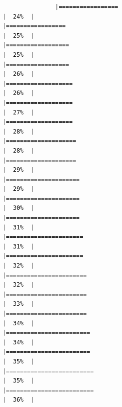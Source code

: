 \documentclass[
]{article}
\begin{document}
\begin{verbatim}
               |=================                                                     |  24%  |                                                                              |=================                                                     |  25%  |                                                                              |==================                                                    |  25%  |                                                                              |==================                                                    |  26%  |                                                                              |===================                                                   |  26%  |                                                                              |===================                                                   |  27%  |                                                                              |===================                                                   |  28%  |                                                                              |====================                                                  |  28%  |                                                                              |====================                                                  |  29%  |                                                                              |=====================                                                 |  29%  |                                                                              |=====================                                                 |  30%  |                                                                              |=====================                                                 |  31%  |                                                                              |======================                                                |  31%  |                                                                              |======================                                                |  32%  |                                                                              |=======================                                               |  32%  |                                                                              |=======================                                               |  33%  |                                                                              |=======================                                               |  34%  |                                                                              |========================                                              |  34%  |                                                                              |========================                                              |  35%  |                                                                              |=========================                                             |  35%  |                                                                              |=========================                                             |  36%  |                                                                
\end{verbatim}
\end{document}
